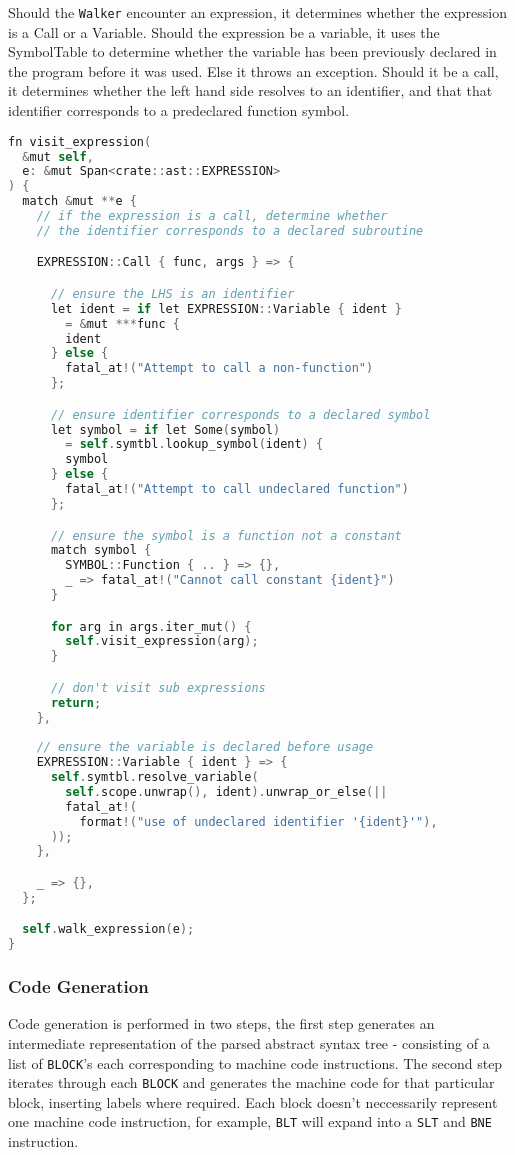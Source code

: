 Should the \texttt{Walker} encounter an expression, it determines whether the expression is a Call or a Variable. Should the expression be a variable, it uses the SymbolTable to determine whether the variable has been previously declared in the program before it was used. Else it throws an exception. Should it be a call, it determines whether the left hand side resolves to an identifier, and that that identifier corresponds to a predeclared function symbol.

\begin{lstlisting}[language=C]
fn visit_expression(
  &mut self, 
  e: &mut Span<crate::ast::EXPRESSION>
) {
  match &mut **e {
    // if the expression is a call, determine whether
    // the identifier corresponds to a declared subroutine

    EXPRESSION::Call { func, args } => {

      // ensure the LHS is an identifier 
      let ident = if let EXPRESSION::Variable { ident } 
        = &mut ***func {
        ident
      } else {
        fatal_at!("Attempt to call a non-function")
      };

      // ensure identifier corresponds to a declared symbol
      let symbol = if let Some(symbol) 
        = self.symtbl.lookup_symbol(ident) {
        symbol
      } else {
        fatal_at!("Attempt to call undeclared function")
      };

      // ensure the symbol is a function not a constant
      match symbol {
        SYMBOL::Function { .. } => {},
        _ => fatal_at!("Cannot call constant {ident}")
      }

      for arg in args.iter_mut() {
        self.visit_expression(arg);
      }

      // don't visit sub expressions
      return; 
    },
    
    // ensure the variable is declared before usage
    EXPRESSION::Variable { ident } => {
      self.symtbl.resolve_variable(
        self.scope.unwrap(), ident).unwrap_or_else(|| 
        fatal_at!(
          format!("use of undeclared identifier '{ident}'"),
      ));
    },

    _ => {},
  };

  self.walk_expression(e);
}
\end{lstlisting}

\subsubsection{Code Generation}
Code generation is performed in two steps, the first step generates an intermediate representation of the parsed abstract syntax tree - consisting of a list of \texttt{BLOCK}'s each corresponding to machine code instructions. The second step iterates through each \texttt{BLOCK} and generates the machine code for that particular block, inserting labels where required. Each block doesn't neccessarily represent one machine code instruction, for example, \texttt{BLT} will expand into a \texttt{SLT} and \texttt{BNE} instruction. 

